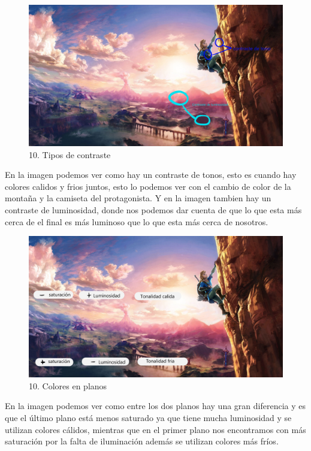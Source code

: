 \documentclass[12pt]{article}
\begin{document}
    \begin{figure}[H]
      \centering
      \includegraphics[width=\textwidth]{images/Selena/10_concept_art contrastes.jpg}
      \caption{\small 10. Tipos de contraste}
    \end{figure}
    En la imagen podemos ver como hay un contraste de tonos, esto es cuando hay colores calidos y frios juntos, esto lo podemos ver con el cambio de color de la montaña y la camiseta del protagonista. Y en la imagen tambien hay un contraste de luminosidad, donde nos podemos dar cuenta de que lo que esta más cerca de el final es más luminoso que lo que esta más cerca de nosotros. 
    \begin{figure}[H]
      \centering
      \includegraphics[width=\textwidth]{images/Selena/10_concept_art c.jpg}
      \caption{\small 10. Colores en planos}
    \end{figure}
    En la imagen podemos ver como entre los dos planos hay una gran diferencia y es que el último plano está menos saturado ya que tiene mucha luminosidad y se utilizan colores cálidos, mientras que en el primer plano nos encontramos con más saturación por la falta de iluminación además se utilizan colores más fríos. 
\end{document}
